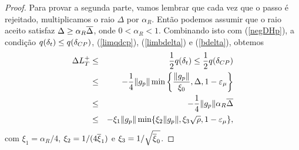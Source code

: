 \begin{proof}
Para provar a segunda parte, vamos lembrar que cada vez que o passo \'e
rejeitado, multiplicamos o raio $\Delta$ por $\alpha_R$. Ent\~ao podemos assumir
que o raio aceito satisfaz $\Delta \geq \alpha_R\overline{\Delta}$, onde $0 <
\alpha_R < 1$. Combinando isto com (\ref{negDHp}), a condição $q(\delta_t) \leq
q(\delta_{CP})$, (\ref{limqdcp}), (\ref{limbdelta}) e (\ref{bdelta}), obtemos 
\begin{eqnarray*}
  \Delta L_T^{+} & \leq & \frac{1}{2} q(\delta_t) \leq \frac{1}{2} q(\delta_{CP}) \\ 
   & \leq & -\frac{1}{4}\Vert g_p\Vert\min\left\{ \frac{\Vert g_p\Vert}{\xi_0},
    \Delta, 1 - \varepsilon_{\mu}\right\} \\ 
  & \leq & - \frac{1}{4}\Vert g_p\Vert\alpha_R\overline{\Delta} \\ 
  & \leq & -\xi_1\Vert g_p\Vert\min\{\xi_2\Vert g_p\Vert, \xi_3\sqrt{\rho}, 1 -
    \varepsilon_{\mu}\}, 
\end{eqnarray*} 
com $\xi_1 = \alpha_R/4$, $\xi_2 = 1/(4\overline{\xi}_1)$ e
$\xi_3 = 1/\sqrt{\overline{\xi}_0}$.  \end{proof}

